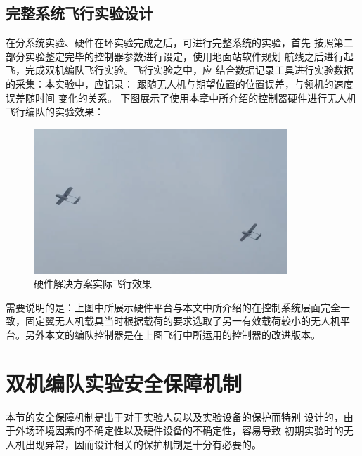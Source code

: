 \subsection{完整系统飞行实验设计}
在分系统实验、硬件在环实验完成之后，可进行完整系统的实验，首先
按照第二部分实验整定完毕的控制器参数进行设定，使用地面站软件规划
航线之后进行起飞，完成双机编队飞行实验。飞行实验之中，应
结合数据记录工具进行实验数据的采集：本实验中，应记录：
跟随无人机与期望位置的位置误差，与领机的速度误差随时间
变化的关系。
下图展示了使用本章中所介绍的控制器硬件进行无人机飞行编队的实验效果：
\begin{figure}[H]
    \centering
    \includegraphics[width=0.85\textwidth]{figures/adds/real_test}
    \caption{硬件解决方案实际飞行效果}\label{fig:real_test}
\end{figure}
需要说明的是：上图中所展示硬件平台与本文中所介绍的在控制系统层面完全一
致，固定翼无人机载具当时根据载荷的要求选取了另一有效载荷较小的无人机平
台。另外本文的编队控制器是在上图飞行中所运用的控制器的改进版本。
\section{双机编队实验安全保障机制}
本节的安全保障机制是出于对于实验人员以及实验设备的保护而特别
设计的，由于外场环境因素的不确定性以及硬件设备的不确定性，容易导致
初期实验时的无人机出现异常，因而设计相关的保护机制是十分有必要的。
